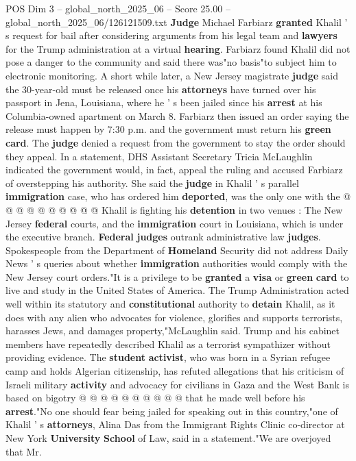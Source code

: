\begin{textsample}{POS Dim 3 – global\_north\_2025\_06 – Score 25.00 – global\_north\_2025\_06/126121509.txt}  \label{ex:f3_pos_094}
\textbf{Judge} Michael Farbiarz \textbf{granted} Khalil ' s request for bail after considering arguments from his legal team and \textbf{lawyers} for the Trump administration at a virtual \textbf{hearing}.
Farbiarz found Khalil did not pose a danger to the community and said there was"no basis"to subject him to electronic monitoring.
A short while later, a New Jersey magistrate \textbf{judge} said the 30-year-old must be released once his \textbf{attorneys} have turned over his passport in Jena, Louisiana, where he ' s been jailed since his \textbf{arrest} at his Columbia-owned apartment on March 8.
Farbiarz then issued an order saying the release must happen by 7:30 p.m. and the government must return his \textbf{green} \textbf{card}.
The \textbf{judge} denied a request from the government to stay the order should they appeal.
In a statement, DHS Assistant Secretary Tricia McLaughlin indicated the government would, in fact, appeal the ruling and accused Farbiarz of overstepping his authority.
She said the \textbf{judge} in Khalil ' s parallel \textbf{immigration} case, who has ordered him \textbf{deported}, was the only one with the @ @ @ @ @ @ @ @ @ @ Khalil is fighting his \textbf{detention} in two venues : The New Jersey \textbf{federal} courts, and the \textbf{immigration} court in Louisiana, which is under the executive branch. \textbf{Federal} \textbf{judges} outrank administrative law \textbf{judges}.
Spokespeople from the Department of \textbf{Homeland} Security did not address Daily News ' s queries about whether \textbf{immigration} authorities would comply with the New Jersey court orders."It is a privilege to be \textbf{granted} a \textbf{visa} or \textbf{green} \textbf{card} to live and study in the United States of America.
The Trump Administration acted well within its statutory and \textbf{constitutional} authority to \textbf{detain} Khalil, as it does with any alien who advocates for violence, glorifies and supports terrorists, harasses Jews, and damages property,"McLaughlin said.
Trump and his cabinet members have repeatedly described Khalil as a terrorist sympathizer without providing evidence.
The \textbf{student} \textbf{activist}, who was born in a Syrian refugee camp and holds Algerian citizenship, has refuted allegations that his criticism of Israeli military \textbf{activity} and advocacy for civilians in Gaza and the West Bank is based on bigotry @ @ @ @ @ @ @ @ @ @ that he made well before his \textbf{arrest}."No one should fear being jailed for speaking out in this country,"one of Khalil ' s \textbf{attorneys}, Alina Das from the Immigrant Rights Clinic co-director at New York \textbf{University} \textbf{School} of Law, said in a statement."We are overjoyed that Mr.

\end{textsample}
